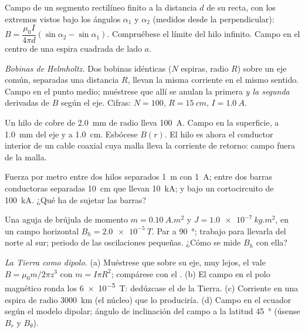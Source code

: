 \begin{exercise}[$\star\star$]\label{exo:b1:magnetostatics:5}
Campo de un segmento rectilíneo finito a la distancia $d$ de su recta,
con los extremos vistos bajo los ángulos $\alpha_1$ y $\alpha_2$ (medidos
desde la perpendicular): $B = \dfrac{\mu_0I}{4\pi d}(\sin\alpha_2 - \sin\alpha_1)$.
Compruébese el límite del hilo infinito. Campo en el centro de una espira
cuadrada de lado $a$.
\end{exercise}

\begin{exercise}[$\star\star$]\label{exo:b1:magnetostatics:6}
\emph{Bobinas de Helmholtz.} Dos bobinas idénticas ($N$ espiras, radio
$R$) sobre un eje común, separadas una distancia $R$, llevan la misma
corriente en el mismo sentido. Campo en el punto medio; muéstrese que
allí se anulan la primera \emph{y la segunda} derivadas de $B$ según el
eje. Cifras: $N = 100$,
$R = \qty{15}{cm}$, $I = \qty{1.0}{A}$.
\end{exercise}

\begin{exercise}[$\star\star$]\label{exo:b1:magnetostatics:7}
Un hilo de cobre de \qty{2.0}{mm} de radio lleva \qty{100}{A}. Campo en la
superficie, a \qty{1.0}{mm} del eje y a \qty{1.0}{cm}. Esbócese $B(r)$.
El hilo es ahora el conductor interior de un cable coaxial cuya malla
lleva la corriente de retorno: campo fuera de la malla.
\end{exercise}

\begin{exercise}[$\star\star$]\label{exo:b1:magnetostatics:8}
Fuerza por metro entre dos hilos separados \qty{1}{m} con \qty{1}{A};
entre dos barras conductoras separadas \qty{10}{cm} que llevan
\qty{10}{kA}; y bajo un cortocircuito de \qty{100}{kA}. ¿Qué ha de
sujetar las barras?
\end{exercise}

\begin{exercise}[$\star\star$]\label{exo:b1:magnetostatics:9}
Una aguja de brújula de momento $m = \qty{0.10}{A.m^2}$ y  $J = \qty{1.0e-7}{kg.m^2}$, en un campo horizontal $B_h = \qty{2.0e-5}{T}$.
Par a \qty{90}{\degree}; trabajo para llevarla del norte al sur; periodo
de las oscilaciones pequeñas. ¿Cómo se mide $B_h$ con ella?
\end{exercise}

\begin{exercise}[$\star\star\star$]\label{exo:b1:magnetostatics:10}
\emph{La Tierra como dipolo.} (a) Muéstrese que sobre su eje, muy lejos,
el  vale $B = \mu_0m/2\pi z^3$ con $m = I\pi R^2$;
compárese con el . (b) El campo en el polo magnético
ronda los \qty{6e-5}{T}: dedúzcase el  de la Tierra.
(c) Corriente en una espira de radio \qty{3000}{km} (el núcleo) que lo
produciría. (d) Campo en el ecuador según el modelo dipolar; ángulo de
inclinación del campo a la latitud \qty{45}{\degree} (úsense $B_r$ y $B_\theta$).
\end{exercise}

